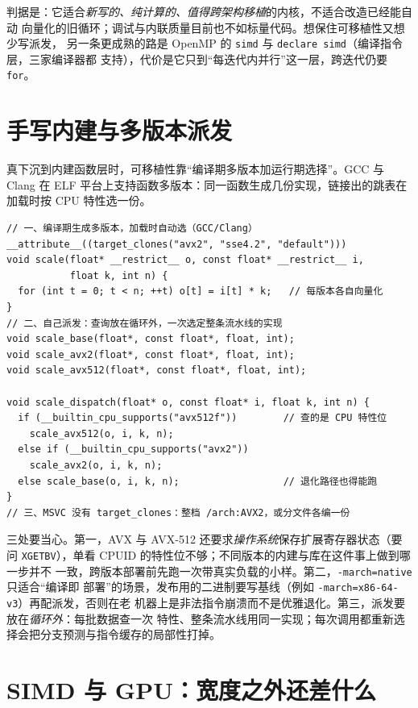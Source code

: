 \documentclass[12pt,a4paper,fontset=fandol]{ctexbook}
\newcommand{\Tp}[1]{\texttt{#1}}
\begin{document}
判据是：它适合\emph{新写的、纯计算的、值得跨架构移植}的内核，不适合改造已经能自动
向量化的旧循环；调试与内联质量目前也不如标量代码。想保住可移植性又想少写派发，
另一条更成熟的路是 OpenMP 的 \Tp{simd} 与 \Tp{declare simd}（编译指令层，三家编译器都
支持），代价是它只到``每迭代内并行''这一层，跨迭代仍要 \Tp{for}。

\section{手写内建与多版本派发}

真下沉到内建函数层时，可移植性靠``编译期多版本加运行期选择''。GCC 与 Clang 在 ELF
平台上支持函数多版本：同一函数生成几份实现，链接出的跳表在加载时按 CPU 特性选一份。
\begin{lstlisting}[style=cppstyle,caption={编译期多版本与运行时分派的骨架}]
// 一、编译期生成多版本，加载时自动选（GCC/Clang）
__attribute__((target_clones("avx2", "sse4.2", "default")))
void scale(float* __restrict__ o, const float* __restrict__ i,
           float k, int n) {
  for (int t = 0; t < n; ++t) o[t] = i[t] * k;   // 每版本各自向量化
}
// 二、自己派发：查询放在循环外，一次选定整条流水线的实现
void scale_base(float*, const float*, float, int);
void scale_avx2(float*, const float*, float, int);
void scale_avx512(float*, const float*, float, int);

void scale_dispatch(float* o, const float* i, float k, int n) {
  if (__builtin_cpu_supports("avx512f"))        // 查的是 CPU 特性位
    scale_avx512(o, i, k, n);
  else if (__builtin_cpu_supports("avx2"))
    scale_avx2(o, i, k, n);
  else scale_base(o, i, k, n);                  // 退化路径也得能跑
}
// 三、MSVC 没有 target_clones：整档 /arch:AVX2，或分文件各编一份
\end{lstlisting}
三处要当心。第一，AVX 与 AVX-512 还要求\emph{操作系统}保存扩展寄存器状态（要问
\Tp{XGETBV}），单看 CPUID 的特性位不够；不同版本的内建与库在这件事上做到哪一步并不
一致，跨版本部署前先跑一次带真实负载的小样。第二，\Tp{-march=native} 只适合``编译即
部署''的场景，发布用的二进制要写基线（例如 \Tp{-march=x86-64-v3}）再配派发，否则在老
机器上是非法指令崩溃而不是优雅退化。第三，派发要放在\emph{循环外}：每批数据查一次
特性、整条流水线用同一实现；每次调用都重新选择会把分支预测与指令缓存的局部性打掉。

\section{SIMD 与 GPU：宽度之外还差什么}
\end{document}
